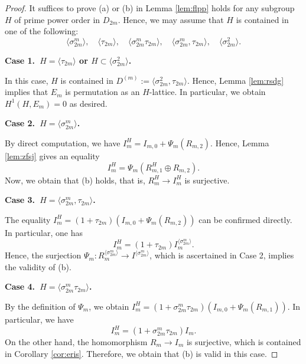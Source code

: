 \documentclass[12pt]{amsart}
\theoremstyle{plain}
\theoremstyle{definition}
\numberwithin{thm}{section}
\numberwithin{equation}{section}
\begin{document}
\begin{proof}
It suffices to prove (a) or (b) in Lemma \ref{lem:flpp} holds for any subgroup $H$ of prime power order in $D_{2m}$. Hence, we may assume that $H$ is contained in one of the following: 
\begin{equation*}
\langle \sigma_{2m}^{m}\rangle,\quad \langle \tau_{2m}\rangle,\quad \langle \sigma_{2m}^{m}\tau_{2m}\rangle,\quad \langle \sigma_{2m}^{m},\tau_{2m}\rangle,\quad \langle \sigma_{2m}^{2}\rangle. 
\end{equation*}

\textbf{Case 1.~$H=\langle \tau_{2m}\rangle$ or $H\subset \langle \sigma_{2m}^{2}\rangle$. }

In this case, $H$ is contained in $D^{(m)}:=\langle \sigma_{2m}^{2},\tau_{2m}\rangle$. Hence, Lemma \ref{lem:rsdg} implies that $E_{m}$ is permutation as an $H$-lattice. In particular, we obtain $H^{1}(H,E_{m})=0$ as desired. 

\textbf{Case 2.~$H=\langle \sigma_{2m}^{m}\rangle$. }

By direct computation, we have $I_{m}^{H}=I_{m,0}+\Psi_{m}(R_{m,2})$. Hence, Lemma \ref{lem:zfsj} gives an equality
\begin{equation*}
    I_{m}^{H}=\Psi_{m}(R_{m,1}^{H}\oplus R_{m,2}). 
\end{equation*}
Now, we obtain that (b) holds, that is, $R_{m}^{H}\rightarrow I_{m}^{H}$ is surjective. 

\textbf{Case 3.~$H=\langle \sigma_{2m}^{m},\tau_{2m}\rangle$. }

The equality $I_{m}^{H}=(1+\tau_{2m})(I_{m,0}+\Psi_{m}(R_{m,2}))$ can be confirmed directly. In particular, one has 
\begin{equation*}
    I_{m}^{H}=(1+\tau_{2m})I_{m}^{\langle \sigma_{2m}^{m}\rangle}. 
\end{equation*}
Hence, the surjection $\Psi_{m}\colon R_{m}^{\langle \sigma_{2m}^{m}\rangle}\rightarrow I^{\langle \sigma_{2m}^{m}\rangle}$, which is  ascertained in Case 2, implies the validity of (b). 

\textbf{Case 4.~$H=\langle \sigma_{2m}^{m}\tau_{2m}\rangle$. }

By the definition of $\Psi_{m}$, we obtain $I_{m}^{H}=(1+\sigma_{2m}^{m}\tau_{2m})(I_{m,0}+\Psi_{m}(R_{m,1}))$. In particular, we have
\begin{equation*}
    I_{m}^{H}=(1+\sigma_{2m}^{m}\tau_{2m})I_{m}. 
\end{equation*}
On the other hand, the homomorphism $R_{m}\rightarrow I_{m}$ is surjective, which is contained in Corollary \ref{cor:eris}. Therefore, we obtain that (b) is valid in this case.  
\end{proof}
\end{document}
